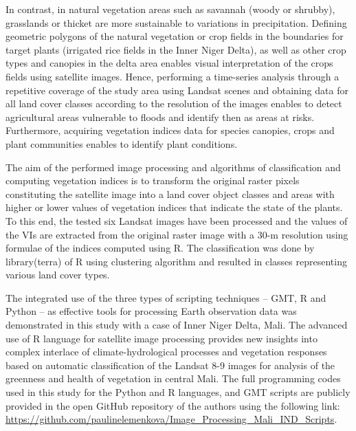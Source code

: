\documentclass[12pt,a4paper,oneside]{article}
\def \newpar{\vspace{6pt}}
\begin{document}
\newpar In contrast, in natural vegetation areas such as savannah (woody or shrubby), grasslands or thicket are more sustainable to variations in precipitation. Defining geometric polygons of the natural vegetation or crop fields in the boundaries for target plants (irrigated rice fields in the Inner Niger Delta), as well as other crop types and canopies in the delta area enables visual interpretation of the crops fields using satellite images. Hence, performing a time-series analysis through a repetitive coverage of the study area using Landsat scenes and obtaining data for all land cover classes according to the resolution of the images enables to detect agricultural areas vulnerable to floods and identify then as areas at risks. Furthermore, acquiring vegetation indices data for species canopies, crops and plant communities enables to identify plant conditions.

\newpar The aim of the performed image processing and algorithms of classification and computing vegetation indices is to transform the original raster pixels constituting the satellite image into a land cover object classes and areas with higher or lower values of vegetation indices that indicate the state of the plants. To this end, the tested six Landsat images have been processed and the values of the VIs are extracted from the original raster image with a 30-m resolution using formulae of the indices computed using R. The classification was done by library(terra) of R using clustering algorithm and resulted in classes representing various land cover types.

\newpar The integrated use of the three types of scripting techniques -- GMT, R and Python -- as effective tools for processing Earth observation data was demonstrated in this study with a case of Inner Niger Delta, Mali. The advanced use of R language for satellite image processing provides new insights into complex interlace of climate-hydrological processes and vegetation responses based on automatic classification of the Landsat 8-9 images for analysis of the greenness and health of vegetation in central Mali. The full programming codes used in this study for the Python and R languages, and GMT scripts are publicly provided in the open GitHub repository of the authors using the following link: \href{https://github.com/paulinelemenkova/Image_Processing_Mali_IND_Scripts}{https://github.com/paulinelemenkova/Image\_Processing\_Mali\_IND\_Scripts}. 
\end{document}
